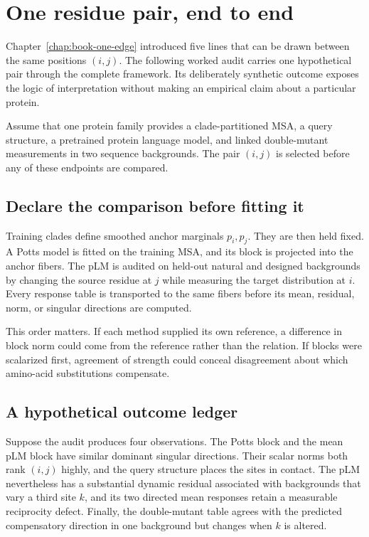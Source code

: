 \section{One residue pair, end to end}
\label{sec:book-vertical-audit}

Chapter~\ref{chap:book-one-edge} introduced five lines that can be drawn between the same positions $(i,j)$.
The following worked audit carries one hypothetical pair through the complete framework.  Its
deliberately synthetic outcome exposes the logic of interpretation without making an empirical
claim about a particular protein.

Assume that one protein family provides a clade-partitioned MSA, a query structure, a pretrained
protein language model, and linked double-mutant measurements in two sequence backgrounds.  The
pair $(i,j)$ is selected before any of these endpoints are compared.

\subsection{Declare the comparison before fitting it}

Training clades define smoothed anchor marginals $p_i,p_j$.  They are then held fixed.  A Potts
model is fitted on the training MSA, and its block is projected into the anchor fibers.  The pLM is
audited on held-out natural and designed backgrounds by changing the source residue at $j$ while
measuring the target distribution at $i$.  Every response table is transported to the same fibers
before its mean, residual, norm, or singular directions are computed.

This order matters.  If each method supplied its own reference, a difference in block norm could
come from the reference rather than the relation.  If blocks were scalarized first, agreement of
strength could conceal disagreement about which amino-acid substitutions compensate.

\subsection{A hypothetical outcome ledger}

Suppose the audit produces four observations.  The Potts block and the mean pLM block have similar
dominant singular directions.  Their scalar norms both rank $(i,j)$ highly, and the query structure
places the sites in contact.  The pLM nevertheless has a substantial dynamic residual associated
with backgrounds that vary a third site $k$, and its two directed mean responses retain a measurable
reciprocity defect.  Finally, the double-mutant table agrees with the predicted compensatory
direction in one background but changes when $k$ is altered.

